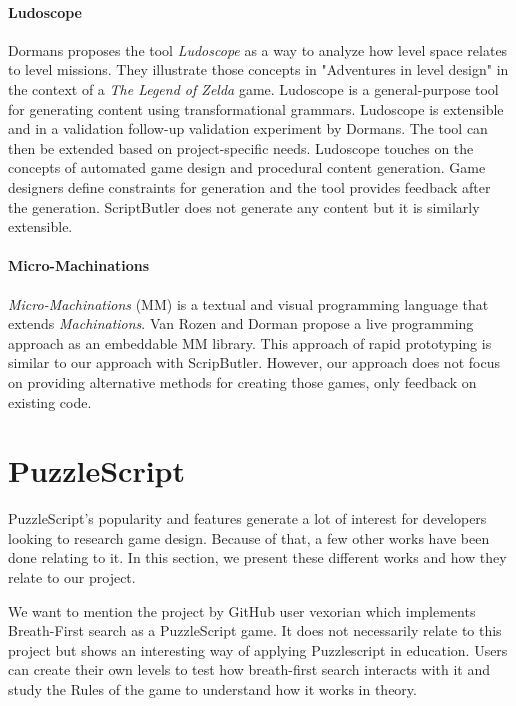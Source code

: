 \paragraph{Ludoscope} Dormans proposes the tool \emph{Ludoscope} as a way to analyze how level space relates to level missions. They illustrate those concepts in "Adventures in level design"\cite{DBLP:conf/fdg/Dormans10} in the context of a \emph{The Legend of Zelda} game. Ludoscope is a general-purpose tool for generating content using transformational grammars. Ludoscope is extensible and in a validation follow-up validation experiment by Dormans\cite{Dormans2013CombinatorialAE}. The tool can then be extended based on project-specific needs. Ludoscope touches on the concepts of automated game design and procedural content generation. Game designers define constraints for generation and the tool provides feedback after the generation. ScriptButler does not generate any content but it is similarly extensible. 

\paragraph{Micro-Machinations} \emph{Micro-Machinations}\cite{DBLP:conf/sle/KlintR13} (MM) is a textual and visual programming language that extends \emph{Machinations}. Van Rozen and Dorman\cite{DBLP:conf/fdg/RozenD14} propose a live programming approach as an embeddable MM library. This approach of rapid prototyping is similar to our approach with ScripButler. However, our approach does not focus on providing alternative methods for creating those games, only feedback on existing code.



\section{PuzzleScript}
PuzzleScript's popularity and features generate a lot of interest for developers looking to research game design. Because of that, a few other works have been done relating to it. In this section, we present these different works and how they relate to our project.

We want to mention the project by GitHub user vexorian\cite{puzzlescript-bfs} which implements Breath-First search as a PuzzleScript game. It does not necessarily relate to this project but shows an interesting way of applying Puzzlescript in education. Users can create their own levels to test how breath-first search interacts with it and study the Rules of the game to understand how it works in theory. 

